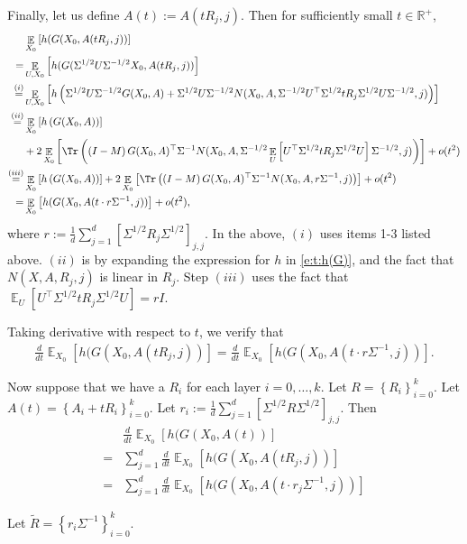 \documentclass{article}
\DeclareMathOperator{\E}{\mathbb{E}}
\newcommand{\R}{\mathbb{R}}
\newcommand*\lrb[1]{\left[ #1 \right]}
\newcommand*\lrp[1]{\left( #1 \right)}
\newcommand*\lrbb[1]{\left\{ #1 \right\}}
\begin{document}
Finally, let us define $A(t):= A(tR_j,j)$. Then for sufficiently small $t\in \R^+$,
\begin{align*}
& \E_{X_0}\lrb{h(G(X_0, A(tR_j, j))}\\
=& \E_{U,X_0}\lrb{h(G(\Sigma^{1/2} U \Sigma^{-1/2}X_0, A(tR_j, j))}\\
\overset{(i)}{=}& \E_{U,X_0}\lrb{h\lrp{\Sigma^{1/2} U \Sigma^{-1/2}G(X_0, A) + \Sigma^{1/2} U \Sigma^{-1/2} N(X_0, A, \Sigma^{-1/2} U^\top \Sigma^{1/2} tR_j \Sigma^{1/2} U \Sigma^{-1/2},j)}}\\
\overset{(ii)}{=}& \E_{X_0}\lrb{h\lrp{G(X_0, A)}} \\
& + 2 \E_{X_0}\lrb{\Tr\lrp{\lrp{I-M} G(X_0,A)^\top \Sigma^{-1} N(X_0, A, \Sigma^{-1/2} \E_{U}\lrb{U^\top \Sigma^{1/2} tR_j \Sigma^{1/2} U} \Sigma^{-1/2},j)}} + o(t^2)\\
\overset{(iii)}{=}& \E_{X_0}\lrb{h\lrp{G(X_0, A)}} + 2 \E_{X_0}\lrb{\Tr\lrp{\lrp{I-M} G(X_0,A)^\top \Sigma^{-1} N(X_0, A, r \Sigma^{-1},j)}} + o(t^2)\\
=& \E_{X_0}\lrb{h(G(X_0, A(t\cdot r \Sigma^{-1}, j))} + o(t^2),
\end{align*}
where $r:= \frac{1}{d} \sum_{j=1}^d \lrb{\Sigma^{1/2} R_j \Sigma^{1/2}}_{j,j}$. In the above, $(i)$ uses items 1-3 listed above. $(ii)$ is by expanding the expression for $h$ in \eqref{e:t:h(G)}, and the fact that $N(X,A,R_j,j)$ is linear in $R_j$. Step $(iii)$ uses the fact that $\E_{U}\lrb{U^\top \Sigma^{1/2} tR_j \Sigma^{1/2} U} = r I$.

Taking derivative with respect to $t$, we verify that
\begin{align*}
\frac{d}{dt} \E_{X_0}\lrb{h(G(X_0, A(tR_j, j))} = \frac{d}{dt} \E_{X_0}\lrb{h(G(X_0, A(t\cdot r \Sigma^{-1}, j))}.
\end{align*}

Now suppose that we have a $R_i$ for each layer $i=0,\dots,k$. Let ${R} = \lrbb{{R}_i}_{i=0}^k$. Let ${A}(t) = \lrbb{A_i + t{R}_i}_{i=0}^k$. Let ${r}_i := \frac{1}{d} \sum_{j=1}^d \lrb{\Sigma^{1/2} R \Sigma^{1/2}}_{j,j}$. Then
\begin{align*}
& \frac{d}{dt} \E_{X_0}\lrb{h(G(X_0, {A}(t))}\\
=& \sum_{j=1}^d \frac{d}{dt} \E_{X_0}\lrb{h(G(X_0, A(t{R}_j, j))}\\
=& \sum_{j=1}^d \frac{d}{dt} \E_{X_0}\lrb{h(G(X_0, A(t\cdot {r}_j \Sigma^{-1}, j))}
\end{align*}

Let $\tilde{R} = \lrbb{r_i \Sigma^{-1}}_{i=0}^k$. 
\end{document}

